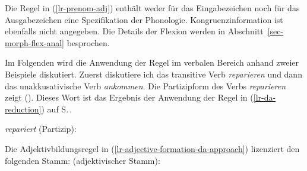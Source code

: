 {\noindent
Die Regel in (\ref{lr-prenom-adj}) enthält weder für das Eingabezeichen noch für das Ausgabezeichen eine Spezifikation der Phonologie.
Kongruenzinformation ist ebenfalls nicht angegeben. Die Details der Flexion werden in Abschnitt~\ref{sec-morph-flex-anal}
besprochen.

Im Folgenden wird die Anwendung der Regel im verbalen Bereich anhand zweier Beispiele
diskutiert. Zuerst diskutiere ich das transitive Verb \emph{reparieren} und dann das unakkusativische Verb \emph{ankommen}.
Die Partizipform des Verbs \emph{reparieren} zeigt (). Dieses Wort ist
das Ergebnis der Anwendung der Regel in (\ref{lr-da-reduction}) auf S.\,\pageref{lr-da-reduction}.

\eas
\emph{repariert} (Partizip):\\
\zs

\noindent
Die Adjektivbildungsregel in (\ref{lr-adjective-formation-da-approach}) lizenziert
den folgenden Stamm:
\eas
{} (adjektivischer Stamm):\\
\zs

}
